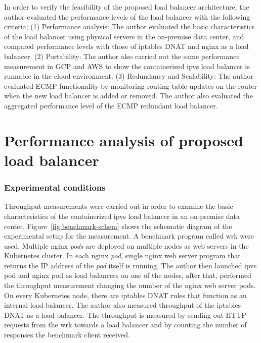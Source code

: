 
In order to verify the feasibility of the proposed load balancer architecture, the author evaluated the performance levels of the load balancer with the following criteria;
(1) Performance analysis:
The author evaluated the basic characteristics of the load balancer using physical servers in the on-premise data center, and compared performance levels with those of iptables DNAT and nginx as a load balancer.
(2) Portability:
The author also carried out the same performance measurement in GCP and AWS to show the containerized ipvs load balancer is runnable in the cloud environment.
(3) Redundancy and Scalability:
The author evaluated ECMP functionality by monitoring routing table updates on the router when the new load balancer is added or removed.
The author also evaluated the aggregated performance level of the ECMP redundant load balancer.

\section{Performance analysis of proposed load balancer}

\subsubsection{Experimental conditions}

Throughput measurements were carried out in order to examine the basic characteristics of the containerized ipvs load balancer in an on-premise data center.
Figure~\ref{fig:benchmark-schem} shows the schematic diagram of the experimental setup for the measurement.
A benchmark program called wrk\cite{Glozer2016} were used.
Multiple nginx {\em pods} are deployed on multiple nodes as web servers in the Kubernetes cluster.
In each nginx {\em pod}, single nginx web server program that returns the IP address of the {\em pod} itself is running.
The author then launched ipvs pod and nginx pod as load balancers on one of the nodes, after that, performed the throughput measurement changing the number of the nginx web server pods.
On every Kubernetes node, there are iptables DNAT rules that function as an internal load balancer.
The author also measured throughput of the iptables DNAT as a load balancer.
The throughput is measured by sending out HTTP requests from the wrk towards a load balancer and by counting the number of responses the benchmark client received.

